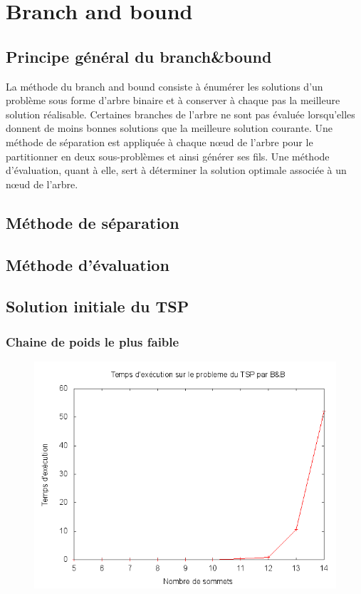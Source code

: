 
\section{Branch and bound}

\subsection{Principe général du branch\&bound}
La méthode du branch and bound consiste à énumérer les solutions d'un problème sous forme d'arbre binaire et à conserver à chaque pas la meilleure solution réalisable. Certaines branches de l'arbre ne sont pas évaluée lorsqu'elles donnent de moins bonnes solutions que la meilleure solution courante. Une méthode de séparation est appliquée à chaque nœud de l'arbre pour le partitionner en deux sous-problèmes et ainsi générer ses fils. Une méthode d'évaluation, quant à elle, sert à déterminer la solution optimale associée à un nœud de l'arbre.

\subsection{Méthode de séparation}


\subsection{Méthode d'évaluation}


\subsection{Solution initiale du TSP}

\subsubsection{Chaine de poids le plus faible}
\begin{figure}[H]
	\includegraphics[width=\linewidth]{../pratique/branch_and_bound_dev/tsp_bb.png}
\end{figure}

